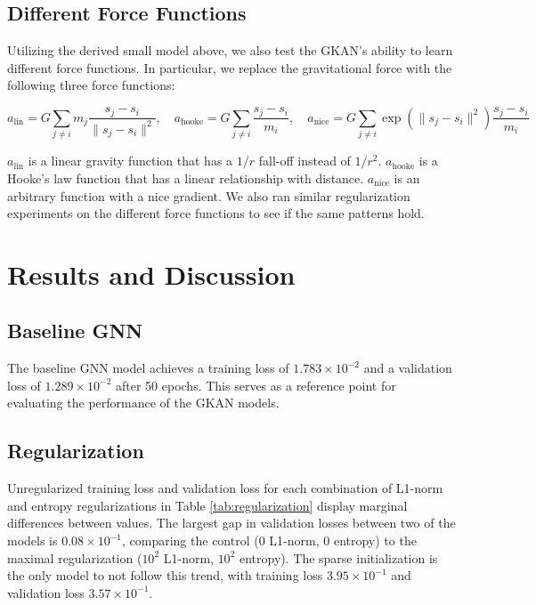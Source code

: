 \documentclass{article}
\begin{document}
\subsection{Different Force Functions}

Utilizing the derived small model above, we also test the GKAN's ability to learn different force functions. In particular, we replace the gravitational force with the following three force functions:

\[
a_{\text{lin}} = G \sum_{j \neq i} m_{j} \frac{s_{j} - s_{i}}{\|s_{j} - s_{i}\|^{2}}, \quad
a_{\text{hooke}} = G \sum_{j \neq i} \frac{s_{j} - s_{i}}{m_i}, \quad
a_{\text{nice}} = G \sum_{j \neq i} \exp(\|s_j - s_i\|^2) \frac{s_j - s_i}{m_i}
\]

$a_{\text{lin}}$ is a linear gravity function that has a $1/r$ fall-off instead of $1/r^2$. $a_{\text{hooke}}$ is a Hooke's law function that has a linear relationship with distance. $a_{\text{nice}}$ is an arbitrary function with a nice gradient. We also ran similar regularization experiments on the different force functions to see if the same patterns hold.

\section{Results and Discussion}

\subsection{Baseline GNN}
The baseline GNN model achieves a training loss of $1.783 \times 10^{-2}$ and a validation loss of $1.289 \times 10^{-2}$ after 50 epochs. This serves as a reference point for evaluating the performance of the GKAN models.

\subsection{Regularization}
Unregularized training loss and validation loss for each combination of L1-norm and entropy regularizations in Table \ref{tab:regularization} display marginal differences between values. The largest gap in validation losses between two of the models is $0.08\times 10^{-1}$, comparing the control ($0$ L1-norm, $0$ entropy) to the maximal regularization ($10^{2}$ L1-norm, $10^{2}$ entropy). The sparse initialization is the only model to not follow this trend, with training loss $3.95\times 10^{-1}$ and validation loss $3.57\times 10^{-1}$.
\end{document}
